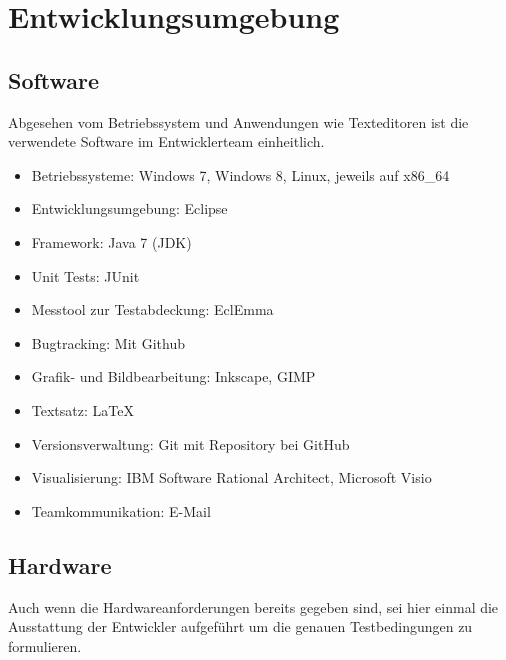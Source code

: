 \documentclass[10pt]{scrreprt}
\begin{document}
\chapter{Entwicklungsumgebung}
\section{Software}
Abgesehen vom Betriebssystem und Anwendungen wie Texteditoren ist die verwendete Software im Entwicklerteam einheitlich.
\begin{itemize}
\item Betriebssysteme: Windows 7, Windows 8, Linux, jeweils auf x86{\_}64
\item Entwicklungsumgebung: Eclipse
\item Framework: Java 7 (JDK)
\item Unit Tests: JUnit
\item Messtool zur Testabdeckung: EclEmma
\item Bugtracking: Mit Github
\item Grafik- und Bildbearbeitung: Inkscape, GIMP
\item Textsatz: \LaTeX
\item Versionsverwaltung: Git mit Repository bei GitHub
\item Visualisierung: IBM Software Rational Architect, Microsoft Visio
\item Teamkommunikation: E-Mail
\end{itemize}

\vspace{5mm}
\section{Hardware}
Auch wenn die Hardwareanforderungen bereits gegeben sind, sei hier einmal die Ausstattung der Entwickler aufgeführt um die genauen Testbedingungen zu formulieren.

\vspace{0.5cm}
\end{document}
